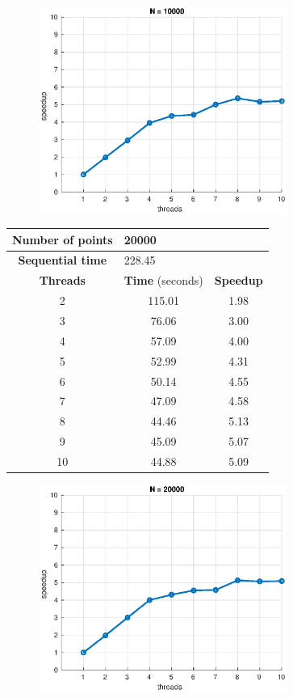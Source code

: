 \documentclass[10pt,twocolumn,letterpaper]{article}
\begin{document}
\begin{figure}[H]
\centering
\includegraphics[width=3.2in]{fig/speedup10000.eps}
\end{figure}

\begin{table}[H]
\centering
\begin{tabular}{ccc}
\hline
\textbf{Number of points} & \multicolumn{2}{l}{20000} \\ 
\hline
\textbf{Sequential time} & \multicolumn{2}{l}{228.45} \\
\hline
\textbf{Threads} & \textbf{Time} (seconds) & \textbf{Speedup} \\
\hline
2 & 115.01 & 1.98 \\
3 & 76.06 & 3.00 \\
4 & 57.09 & 4.00 \\
5 & 52.99 & 4.31 \\
6 & 50.14 & 4.55 \\
7 & 47.09 & 4.58 \\
8 & 44.46 & 5.13 \\
9 & 45.09 & 5.07 \\
10 & 44.88 & 5.09 \\
\hline
\end{tabular}
\end{table}

\begin{figure}[H]
\centering
\includegraphics[width=3.2in]{fig/speedup20000.eps}
\end{figure}
\end{document}
